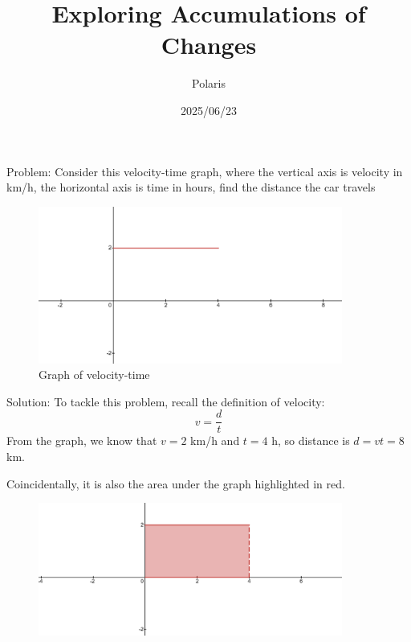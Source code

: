 \documentclass{article}
\title{Exploring Accumulations of Changes}
\author{Polaris}
\date{2025/06/23}
\begin{document}
\maketitle

Problem: Consider this velocity-time graph, where the vertical axis is velocity in km/h, the horizontal axis is time in hours, find the distance the car travels

\begin{figure}[H]
    \includegraphics[width = 10cm]{change.png}
    \centering
    \caption{Graph of velocity-time}
\end{figure}

Solution:
To tackle this problem, recall the definition of velocity:
\[
v = \frac{d}{t}
\]
From the graph, we know that $v=2$ km/h and $t=4$ h, so distance is $d = vt = 8$km.

Coincidentally, it is also the area under the graph highlighted in red.

\begin{figure}[H]
    \centering
    \includegraphics[width = 10cm]{highlightedChange.png}
\end{figure}
\end{document}
